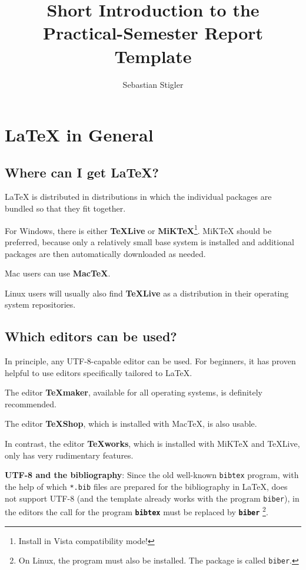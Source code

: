 \documentclass[pdftex,a4paper]{scrartcl}
\title{Short Introduction to the Practical-Semester Report Template}
\author{Sebastian Stigler}
\begin{document}
\maketitle

\tableofcontents

\section{\LaTeX{} in General}

\subsection{Where can I get \LaTeX{}?}
\LaTeX{} is distributed in distributions in which the individual packages are bundled so that they fit together.

For Windows, there is either \textbf{\TeX{}Live}\autocite{tug:texlive} or \textbf{MiK\TeX}\footnote{Install in Vista compatibility mode!}\autocite{schenk:miktex}.
MiK\TeX{} should be preferred, because only a relatively small base system is installed and additional packages are then automatically downloaded as needed.

Mac users can use \textbf{Mac\TeX}\autocite{tug:mactex}.

Linux users will usually also find \textbf{\TeX{}Live}\autocite{tug:texlive} as a distribution in their operating system repositories.

\subsection{Which editors can be used?}

In principle, any UTF-8-capable editor can be used. For beginners, it has proven helpful to use editors specifically tailored to \LaTeX{}.

The editor \textbf{\TeX{}maker}\autocite{brachet:texmaker}, available for all operating systems, is definitely recommended.

The editor \textbf{\TeX{}Shop}, which is installed with Mac\TeX{}, is also usable.

In contrast, the editor \textbf{\TeX{}works}, which is installed with MiK\TeX{} and \TeX{}Live, only has very rudimentary features.

\begin{warningblock}
\textbf{UTF-8 and the bibliography}: %
Since the old well-known \texttt{bibtex} program, %
with the help of which \texttt{*.bib} files are prepared %
for the bibliography in \LaTeX{}, does not support UTF-8 %
(and the template already works with the program %
{\texttt{biber}}), in the editors %
the call for the program \textbf{\texttt{bibtex}} %
must be replaced by \textbf{\texttt{biber}}%
\footnote{On Linux, the program must also be installed. %
The package is called \texttt{biber}.}.
\end{warningblock}
\end{document}
